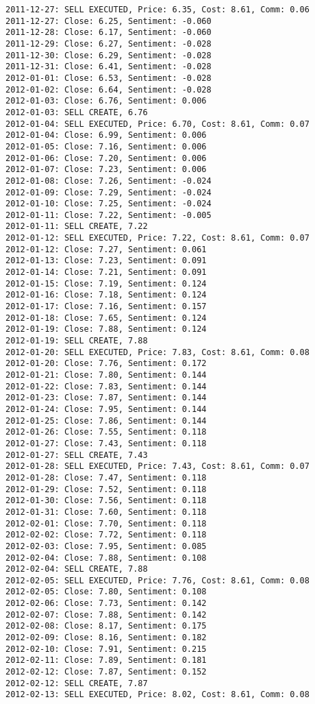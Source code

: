 \documentclass[11pt]{article}
\begin{document}
\begin{Verbatim}[commandchars=\\\{\}]
2011-12-27: SELL EXECUTED, Price: 6.35, Cost: 8.61, Comm: 0.06
2011-12-27: Close: 6.25, Sentiment: -0.060
2011-12-28: Close: 6.17, Sentiment: -0.060
2011-12-29: Close: 6.27, Sentiment: -0.028
2011-12-30: Close: 6.29, Sentiment: -0.028
2011-12-31: Close: 6.41, Sentiment: -0.028
2012-01-01: Close: 6.53, Sentiment: -0.028
2012-01-02: Close: 6.64, Sentiment: -0.028
2012-01-03: Close: 6.76, Sentiment: 0.006
2012-01-03: SELL CREATE, 6.76
2012-01-04: SELL EXECUTED, Price: 6.70, Cost: 8.61, Comm: 0.07
2012-01-04: Close: 6.99, Sentiment: 0.006
2012-01-05: Close: 7.16, Sentiment: 0.006
2012-01-06: Close: 7.20, Sentiment: 0.006
2012-01-07: Close: 7.23, Sentiment: 0.006
2012-01-08: Close: 7.26, Sentiment: -0.024
2012-01-09: Close: 7.29, Sentiment: -0.024
2012-01-10: Close: 7.25, Sentiment: -0.024
2012-01-11: Close: 7.22, Sentiment: -0.005
2012-01-11: SELL CREATE, 7.22
2012-01-12: SELL EXECUTED, Price: 7.22, Cost: 8.61, Comm: 0.07
2012-01-12: Close: 7.27, Sentiment: 0.061
2012-01-13: Close: 7.23, Sentiment: 0.091
2012-01-14: Close: 7.21, Sentiment: 0.091
2012-01-15: Close: 7.19, Sentiment: 0.124
2012-01-16: Close: 7.18, Sentiment: 0.124
2012-01-17: Close: 7.16, Sentiment: 0.157
2012-01-18: Close: 7.65, Sentiment: 0.124
2012-01-19: Close: 7.88, Sentiment: 0.124
2012-01-19: SELL CREATE, 7.88
2012-01-20: SELL EXECUTED, Price: 7.83, Cost: 8.61, Comm: 0.08
2012-01-20: Close: 7.76, Sentiment: 0.172
2012-01-21: Close: 7.80, Sentiment: 0.144
2012-01-22: Close: 7.83, Sentiment: 0.144
2012-01-23: Close: 7.87, Sentiment: 0.144
2012-01-24: Close: 7.95, Sentiment: 0.144
2012-01-25: Close: 7.86, Sentiment: 0.144
2012-01-26: Close: 7.55, Sentiment: 0.118
2012-01-27: Close: 7.43, Sentiment: 0.118
2012-01-27: SELL CREATE, 7.43
2012-01-28: SELL EXECUTED, Price: 7.43, Cost: 8.61, Comm: 0.07
2012-01-28: Close: 7.47, Sentiment: 0.118
2012-01-29: Close: 7.52, Sentiment: 0.118
2012-01-30: Close: 7.56, Sentiment: 0.118
2012-01-31: Close: 7.60, Sentiment: 0.118
2012-02-01: Close: 7.70, Sentiment: 0.118
2012-02-02: Close: 7.72, Sentiment: 0.118
2012-02-03: Close: 7.95, Sentiment: 0.085
2012-02-04: Close: 7.88, Sentiment: 0.108
2012-02-04: SELL CREATE, 7.88
2012-02-05: SELL EXECUTED, Price: 7.76, Cost: 8.61, Comm: 0.08
2012-02-05: Close: 7.80, Sentiment: 0.108
2012-02-06: Close: 7.73, Sentiment: 0.142
2012-02-07: Close: 7.88, Sentiment: 0.142
2012-02-08: Close: 8.17, Sentiment: 0.175
2012-02-09: Close: 8.16, Sentiment: 0.182
2012-02-10: Close: 7.91, Sentiment: 0.215
2012-02-11: Close: 7.89, Sentiment: 0.181
2012-02-12: Close: 7.87, Sentiment: 0.152
2012-02-12: SELL CREATE, 7.87
2012-02-13: SELL EXECUTED, Price: 8.02, Cost: 8.61, Comm: 0.08

\end{Verbatim}
\end{document}
